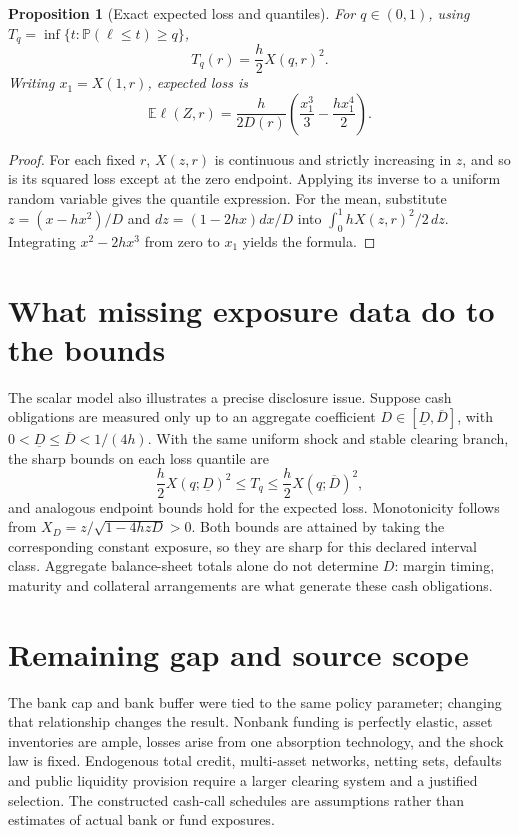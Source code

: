 \documentclass[11pt]{article}
\newtheorem{proposition}[theorem]{Proposition}
\theoremstyle{remark}\newtheorem{remark}[theorem]{Remark}
\newcommand{\E}{\mathbb E}
\newcommand{\Prb}{\mathbb P}
\begin{document}
\begin{proposition}[Exact expected loss and quantiles]
For $q\in(0,1)$, using $T_q=\inf\{t:\Prb(\ell\le t)\ge q\}$,
\[
 T_q(r)=\frac h2X(q,r)^2.
\]
Writing $x_1=X(1,r)$, expected loss is
\[
 \E\ell(Z,r)=\frac{h}{2D(r)}
 \left(\frac{x_1^3}{3}-\frac{h x_1^4}{2}\right).
\]
\end{proposition}
\begin{proof}
For each fixed $r$, $X(z,r)$ is continuous and strictly increasing in $z$, and so is its squared loss except at the zero endpoint. Applying its inverse to a uniform random variable gives the quantile expression. For the mean, substitute $z=(x-hx^2)/D$ and $dz=(1-2hx)dx/D$ into $\int_0^1 hX(z,r)^2/2\,dz$. Integrating $x^2-2hx^3$ from zero to $x_1$ yields the formula.
\end{proof}

\section*{What missing exposure data do to the bounds}
The scalar model also illustrates a precise disclosure issue. Suppose cash obligations are measured only up to an aggregate coefficient $D\in[\underline D,\overline D]$, with $0<\underline D\le\overline D<1/(4h)$. With the same uniform shock and stable clearing branch, the sharp bounds on each loss quantile are
\[
 \frac h2X(q;\underline D)^2\le T_q\le
 \frac h2X(q;\overline D)^2,
\]
and analogous endpoint bounds hold for the expected loss. Monotonicity follows from $X_D=z/\sqrt{1-4hzD}>0$. Both bounds are attained by taking the corresponding constant exposure, so they are sharp for this declared interval class. Aggregate balance-sheet totals alone do not determine $D$: margin timing, maturity and collateral arrangements are what generate these cash obligations.

\section*{Remaining gap and source scope}
The bank cap and bank buffer were tied to the same policy parameter; changing that relationship changes the result. Nonbank funding is perfectly elastic, asset inventories are ample, losses arise from one absorption technology, and the shock law is fixed. Endogenous total credit, multi-asset networks, netting sets, defaults and public liquidity provision require a larger clearing system and a justified selection. The constructed cash-call schedules are assumptions rather than estimates of actual bank or fund exposures.
\end{document}
